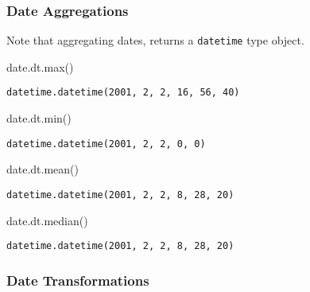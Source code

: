 \documentclass[
  letterpaper,
  DIV=11,
  numbers=noendperiod]{scrartcl}
\newenvironment{Shaded}{\begin{snugshade}}{\end{snugshade}}
\newcommand{\BuiltInTok}[1]{\textcolor[rgb]{0.00,0.23,0.31}{#1}}
\newcommand{\NormalTok}[1]{\textcolor[rgb]{0.00,0.23,0.31}{#1}}
\begin{document}
\hypertarget{date-aggregations}{%
\subsubsection{Date Aggregations}\label{date-aggregations}}

Note that aggregating dates, returns a \texttt{datetime} type object.

\begin{Shaded}
\begin{Highlighting}[]
\NormalTok{date.dt.}\BuiltInTok{max}\NormalTok{()}
\end{Highlighting}
\end{Shaded}

\begin{verbatim}
datetime.datetime(2001, 2, 2, 16, 56, 40)
\end{verbatim}

\begin{Shaded}
\begin{Highlighting}[]
\NormalTok{date.dt.}\BuiltInTok{min}\NormalTok{()}
\end{Highlighting}
\end{Shaded}

\begin{verbatim}
datetime.datetime(2001, 2, 2, 0, 0)
\end{verbatim}

\begin{Shaded}
\begin{Highlighting}[]
\NormalTok{date.dt.mean()}
\end{Highlighting}
\end{Shaded}

\begin{verbatim}
datetime.datetime(2001, 2, 2, 8, 28, 20)
\end{verbatim}

\begin{Shaded}
\begin{Highlighting}[]
\NormalTok{date.dt.median()}
\end{Highlighting}
\end{Shaded}

\begin{verbatim}
datetime.datetime(2001, 2, 2, 8, 28, 20)
\end{verbatim}

\hypertarget{date-transformations}{%
\subsubsection{Date Transformations}\label{date-transformations}}
\end{document}
